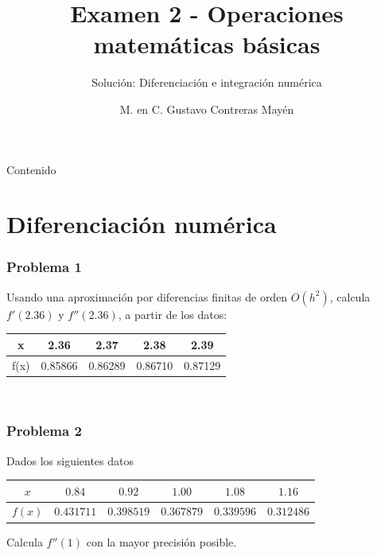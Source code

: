 
\usepackage{cancel}


\title{Examen 2 - Operaciones matemáticas básicas}
\subtitle{Solución: Diferenciación e integración numérica}
\author[]{M. en C. Gustavo Contreras Mayén}
\maketitle
\fontsize{14}{14}\selectfont
{}
\begin{frame}{Contenido}
\tableofcontents[pausesections]
\end{frame}
\section{Diferenciación numérica}
\begin{frame}[fragile]
\frametitle{Problema 1}
Usando una aproximación por diferencias finitas de orden $O(h^{2})$, calcula $f'(2.36)$ y $f''(2.36)$, a partir de los datos:
\begin{center}
\begin{tabular}{c | c | c | c | c}
x & 2.36 & 2.37 & 2.38 & 2.39 \\ \hline
f(x) & 0.85866 & 0.86289 & 0.86710 & 0.87129
\end{tabular}
\end{center}
 \\
\end{frame}
\begin{frame}
\frametitle{Problema 2}
Dados los siguientes datos
\begin{center}
{\normalsize
\begin{tabular}{c | c | c | c | c | c }
$x$ & $0.84$ & $0.92$ & $1.00$ & $1.08$ & $1.16$ \\ \hline
$f(x)$ & $0.431711$ & $0.398519$ & $0.367879$ & $0.339596$ & $0.312486$
\end{tabular}
}
\end{center}
Calcula $f''(1)$ con la mayor precisión posible.
\\
\end{frame}
